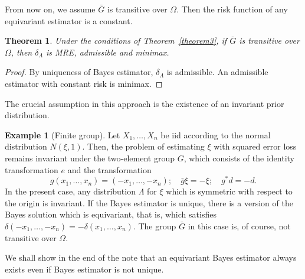 \documentclass{article}
\theoremstyle{plain}
\newtheorem{theorem}{Theorem}
\theoremstyle{definition}
\newtheorem{example}{Example}
\begin{document}
From now on, we assume $\bar{G}$ is transitive over $\Omega$. Then the risk function of any equivariant estimator is a constant.
\begin{theorem}\label{theorem4}
    Under the conditions of Theorem~\ref{theorem3}, if $\bar{G}$ is transitive over $\Omega$, then $\delta_{\Lambda}$ is MRE, admissible and minimax.
\end{theorem}
\begin{proof}
    By uniqueness of Bayes estimator, $\delta_{\Lambda}$ is admissible.
An admissible estimator with constant risk is minimax.
\end{proof}
The crucial assumption in this approach is the existence of an invariant prior distribution.
\begin{example}[Finite group]
    Let $X_1,\ldots,X_n$ be iid according to the normal distribution $N(\xi,1)$. Then, the problem of estimating $\xi$ with squared error loss remains invariant under the two-element group $G$, which consists of the identity transformation $e$ and the transformation
    \begin{equation*}
        g(x_1,\ldots,x_n)=(-x_1,\ldots,-x_n);\quad \bar{g}\xi=-\xi;\quad g^* d=-d.
    \end{equation*}
    In the present case, any distribution $\Lambda$ for $\xi$ which is symmetric with respect to the origin is invariant. If the Bayes estimator is unique, there is a version of the Bayes solution which is equivariant, that is, which satisfies $\delta(-x_1,\ldots,-x_n)=-\delta(x_1,\ldots,x_n)$. The group $\bar{G}$ in this case is, of course, not transitive over $\Omega$.

    We shall show in the end of the note that an equivariant Bayes estimator always exists even if Bayes estimator is not unique.
\end{example}
\end{document}
